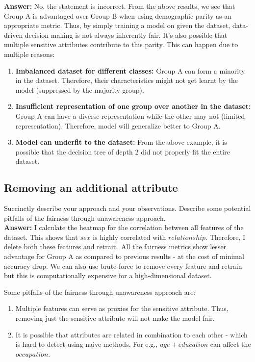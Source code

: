 \textbf{Answer:} No, the statement is incorrect. From the above results, we see that Group A is advantaged over Group B when using demographic parity as an appropriate metric. Thus, by simply training a model on given the dataset, data-driven decision making is not always inherently fair. It's also possible that multiple sensitive attributes contribute to this parity. This can happen due to multiple reasons:

\begin{enumerate}
    \item \textbf{Imbalanced dataset for different classes:} Group A can form a minority in the dataset. Therefore, their characteristics might not get learnt by the model (suppressed by the majority group).

    \item \textbf{Insufficient representation of one group over another in the dataset:} Group A can have a diverse representation while the other may not (limited representation). Therefore, model will generalize better to Group A.

    \item \textbf{Model can underfit to the dataset:} From the above example, it is possible that the decision tree of depth 2 did not properly fit the entire dataset. 
\end{enumerate}



\setcounter{subsection}{5}
\subsection{Removing an additional attribute}
Succinctly describe your approach and your observations. Describe some potential pitfalls of the fairness through unawareness
approach.\\

\textbf{Answer:} I calculate the heatmap for the correlation between all features of the dataset. This shows that $sex$ is highly correlated with $relationship$. Therefore, I delete both these features and retrain. All the fairness metrics show lesser advantage for Group A as compared to previous results - at the cost of minimal accuracy drop. We can also use brute-force to remove every feature and retrain but this is computationally expensive for a high-dimensional dataset.

Some pitfalls of the fairness through unawareness approach are:
\begin{enumerate}
    \item Multiple features can serve as proxies for the sensitive attribute. Thus, removing just the sensitive attribute will not make the model fair.

    \item It is possible that attributes are related in combination to each other - which is hard to detect using naive methods. For e.g., $age + education$ can affect the $occupation$.
\end{enumerate}


